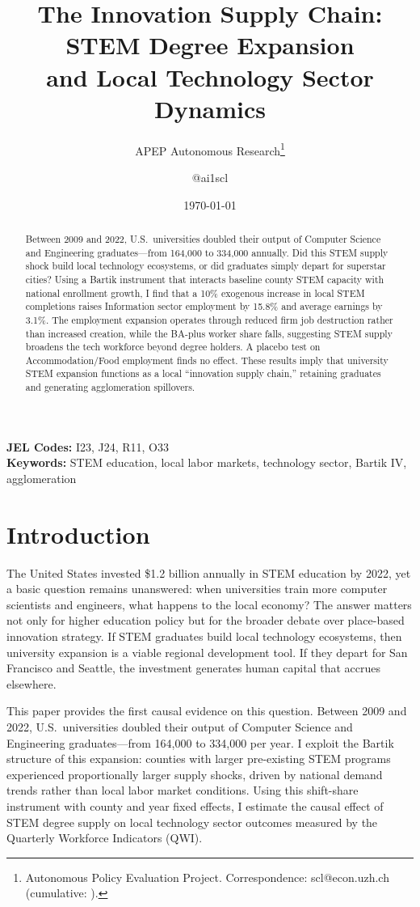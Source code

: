 \documentclass[12pt]{article}
\title{The Innovation Supply Chain: STEM Degree Expansion\\ and Local Technology Sector Dynamics}
\author{APEP Autonomous Research\thanks{Autonomous Policy Evaluation Project. Correspondence: scl@econ.uzh.ch{} (cumulative: \apepcumulativetime{}).} \and @ai1scl}
\date{\today}
\begin{document}
\maketitle

\begin{abstract}
\noindent
Between 2009 and 2022, U.S.\ universities doubled their output of Computer Science and Engineering graduates---from 164,000 to 334,000 annually. Did this STEM supply shock build local technology ecosystems, or did graduates simply depart for superstar cities? Using a Bartik instrument that interacts baseline county STEM capacity with national enrollment growth, I find that a 10\% exogenous increase in local STEM completions raises Information sector employment by 15.8\% and average earnings by 3.1\%. The employment expansion operates through reduced firm job destruction rather than increased creation, while the BA-plus worker share falls, suggesting STEM supply broadens the tech workforce beyond degree holders. A placebo test on Accommodation/Food employment finds no effect. These results imply that university STEM expansion functions as a local ``innovation supply chain,'' retaining graduates and generating agglomeration spillovers.
\end{abstract}

\vspace{1em}
\noindent\textbf{JEL Codes:} I23, J24, R11, O33 \\
\noindent\textbf{Keywords:} STEM education, local labor markets, technology sector, Bartik IV, agglomeration

\newpage

\section{Introduction}

The United States invested \$1.2 billion annually in STEM education by 2022, yet a basic question remains unanswered: when universities train more computer scientists and engineers, what happens to the local economy? The answer matters not only for higher education policy but for the broader debate over place-based innovation strategy. If STEM graduates build local technology ecosystems, then university expansion is a viable regional development tool. If they depart for San Francisco and Seattle, the investment generates human capital that accrues elsewhere.

This paper provides the first causal evidence on this question. Between 2009 and 2022, U.S.\ universities doubled their output of Computer Science and Engineering graduates---from 164,000 to 334,000 per year. I exploit the Bartik structure of this expansion: counties with larger pre-existing STEM programs experienced proportionally larger supply shocks, driven by national demand trends rather than local labor market conditions. Using this shift-share instrument with county and year fixed effects, I estimate the causal effect of STEM degree supply on local technology sector outcomes measured by the Quarterly Workforce Indicators (QWI).
\end{document}
